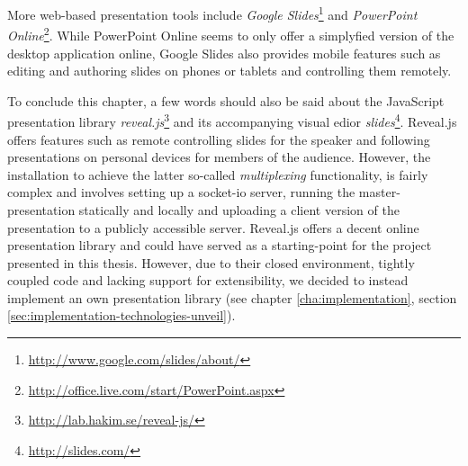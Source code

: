More web-based presentation tools include \emph{Google Slides}\footnote{\url{http://www.google.com/slides/about/}} and \emph{PowerPoint Online}\footnote{\url{http://office.live.com/start/PowerPoint.aspx}}. While PowerPoint Online seems to only offer a simplyfied version of the desktop application online, Google Slides also provides mobile features such as editing and authoring slides on phones or tablets and controlling them remotely.

To conclude this chapter, a few words should also be said about the JavaScript presentation library \emph{reveal.js}\footnote{\url{http://lab.hakim.se/reveal-js/}} and its accompanying visual edior \emph{slides}\footnote{\url{http://slides.com/}}. Reveal.js offers features such as remote controlling slides for the speaker and following presentations on personal devices for members of the audience. However, the installation to achieve the latter so-called \emph{multiplexing} functionality, is fairly complex and involves setting up a socket-io server, running the master-presentation statically and locally and uploading a client version of the presentation to a publicly accessible server. Reveal.js offers a decent online presentation library and could have served as a starting-point for the project presented in this thesis. However, due to their closed environment, tightly coupled code and lacking support for extensibility, we decided to instead implement an own presentation library (see chapter \ref{cha:implementation}, section \ref{sec:implementation-technologies-unveil}).